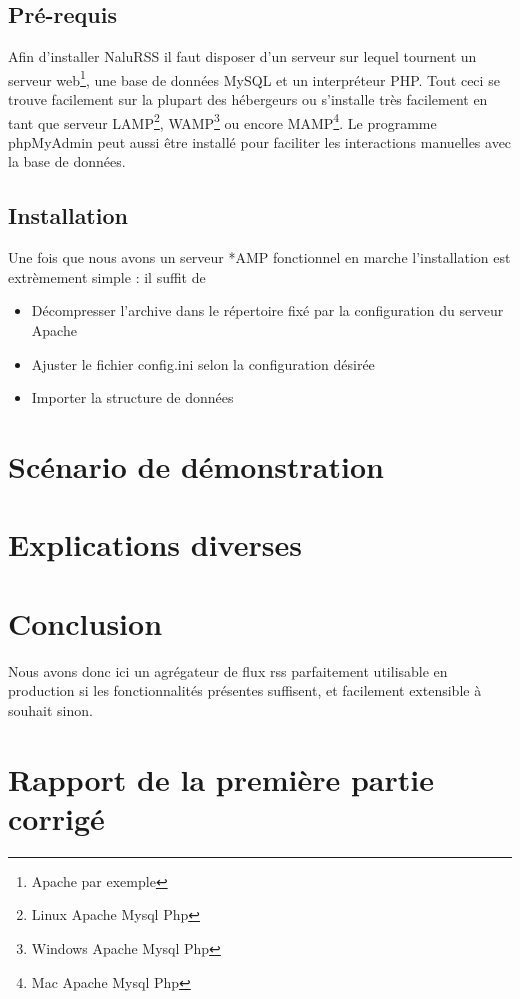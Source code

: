 \documentclass[11pt]{article}
\begin{document}
\subsection{Pré-requis}
Afin d'installer NaluRSS il faut disposer d'un serveur sur lequel tournent un serveur web\footnote{Apache par exemple}, une base de données MySQL et un interpréteur PHP. Tout ceci se trouve facilement sur la plupart des hébergeurs ou s'installe très facilement en tant que serveur LAMP\footnote{Linux Apache Mysql Php}, WAMP\footnote{Windows Apache Mysql Php} ou encore MAMP\footnote{Mac Apache Mysql Php}. Le programme phpMyAdmin peut aussi être installé pour faciliter les interactions manuelles avec la base de données.
\subsection{Installation}
Une fois que nous avons un serveur *AMP fonctionnel en marche l'installation est extrèmement simple : il suffit de 
\begin{itemize}
\item{Décompresser l'archive dans le répertoire fixé par la configuration du serveur Apache}
\item{Ajuster le fichier config.ini selon la configuration désirée}
\item{Importer la structure de données}
\end{itemize}

\section{Scénario de démonstration}

\section{Explications diverses}

\section{Conclusion}
Nous avons donc ici un agrégateur de flux rss parfaitement utilisable en production si les fonctionnalités présentes suffisent, et facilement extensible à souhait sinon.

\section{Rapport de la première partie corrigé}
\end{document}

